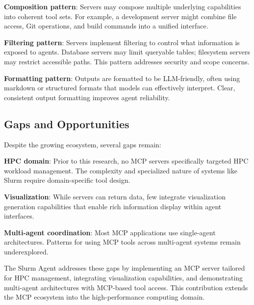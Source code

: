 \textbf{Composition pattern}: Servers may compose multiple underlying capabilities into coherent tool sets. For example, a development server might combine file access, Git operations, and build commands into a unified interface.

\textbf{Filtering pattern}: Servers implement filtering to control what information is exposed to agents. Database servers may limit queryable tables; filesystem servers may restrict accessible paths. This pattern addresses security and scope concerns.

\textbf{Formatting pattern}: Outputs are formatted to be LLM-friendly, often using markdown or structured formats that models can effectively interpret. Clear, consistent output formatting improves agent reliability.

\subsection{Gaps and Opportunities}

Despite the growing ecosystem, several gaps remain:

\textbf{HPC domain}: Prior to this research, no MCP servers specifically targeted HPC workload management. The complexity and specialized nature of systems like Slurm require domain-specific tool design.

\textbf{Visualization}: While servers can return data, few integrate visualization generation capabilities that enable rich information display within agent interfaces.

\textbf{Multi-agent coordination}: Most MCP applications use single-agent architectures. Patterns for using MCP tools across multi-agent systems remain underexplored.

The Slurm Agent addresses these gaps by implementing an MCP server tailored for HPC management, integrating visualization capabilities, and demonstrating multi-agent architectures with MCP-based tool access. This contribution extends the MCP ecosystem into the high-performance computing domain.
